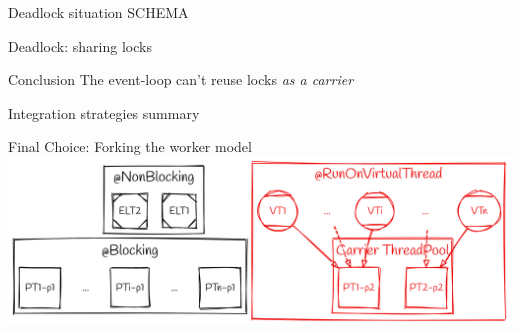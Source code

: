 \documentclass{beamer}
\begin{document}
\begin{frame}{Deadlock situation}
    SCHEMA    
\end{frame}
\begin{frame}{Deadlock: sharing locks}
    \begin{alertblock}{Conclusion}
        The event-loop can't reuse locks \emph{as a carrier}
    \end{alertblock}
\end{frame}
\begin{frame}{Integration strategies summary}
    
\end{frame}
\begin{frame}{Final Choice: Forking the worker model}
    \includegraphics[width=\textwidth]{assets/forking_workers.png}
\end{frame}
\end{document}
